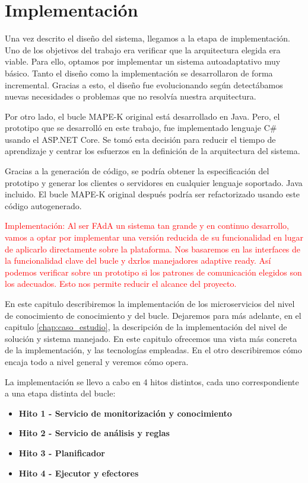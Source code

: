 
\chapter{Implementación}
\label{chap:implementación}

Una vez descrito el diseño del sistema, llegamos a la etapa de implementación. Uno de los objetivos del trabajo era verificar que la arquitectura elegida era viable. Para ello, optamos por implementar un sistema autoadaptativo muy básico. Tanto el diseño como la implementación se desarrollaron de forma incremental. Gracias a esto, el diseño fue evolucionando según detectábamos nuevas necesidades o problemas que no resolvía nuestra arquitectura.

Por otro lado, el bucle MAPE-K original está desarrollado en Java. Pero, el prototipo que se desarrolló en este trabajo, fue implementado lenguaje C\# usando el  ASP.NET Core. Se tomó esta decisión para reducir el tiempo de aprendizaje y centrar los esfuerzos en la definición de la arquitectura del sistema.

Gracias a la generación de código, se podría obtener la especificación del prototipo y generar los clientes o servidores en cualquier lenguaje soportado. Java incluido. El bucle MAPE-K original después podría ser refactorizado usando este código autogenerado.

\textcolor{red}{Implementación: Al ser FAdA un sistema tan grande y en continuo desarrollo, vamos a optar por implementar una versión reducida de su funcionalidad en lugar de aplicarlo directamente sobre la plataforma. Nos basaremos en las interfaces de la funcionalidad clave del bucle y dxrlos manejadores adaptive ready. Así podemos verificar sobre un prototipo si los patrones de comunicación elegidos son los adecuados. Esto nos permite reducir el alcance del proyecto.}

En este capitulo describiremos la implementación de los microservicios del nivel de conocimiento de conocimiento y del bucle. Dejaremos para más adelante, en el capitulo \ref{chap:caso_estudio}, la descripción de la implementación del nivel de solución y sistema manejado. En este capitulo ofrecemos una vista más concreta de la implementación, y las tecnologías empleadas. En el otro describiremos cómo encaja todo a nivel general y veremos cómo opera.

La implementación se llevo a cabo en 4 hitos distintos, cada uno correspondiente a una etapa distinta del bucle:

\begin{itemize}
  \item \textbf{Hito 1 - Servicio de monitorización y conocimiento}
  \item \textbf{Hito 2 - Servicio de análisis y reglas}
  \item \textbf{Hito 3 - Planificador}
  \item \textbf{Hito 4 - Ejecutor y efectores}
\end{itemize}


